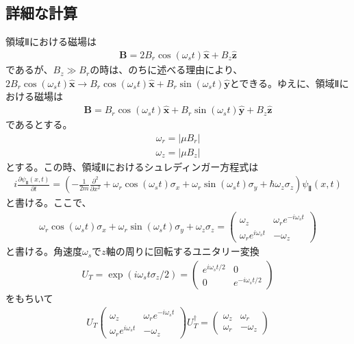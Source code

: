 \subsection{詳細な計算}
領域Ⅱにおける磁場は
\begin{align}
\bm{B}=2B_{r}\cos(\omega_{s}t)\bm{\hat{x}}+B_{z}\bm{\hat{z}}
\end{align}
であるが、$B_{z} \gg B_{r}$の時は、のちに述べる理由により、$2B_{r}\cos(\omega_{s}t)\bm{\hat{x}} \to  B_{r}\cos(\omega_{s}t)\bm{\hat{x}}+B_{r}\sin(\omega_{s}t)\bm{\hat{y}}$とできる。ゆえに、領域Ⅱにおける磁場は
\begin{align}
\bm{B}=B_{r}\cos(\omega_{s}t)\bm{\hat{x}}+B_{r}\sin(\omega_{s}t)\bm{\hat{y}}+B_{z}\bm{\hat{z}}
\end{align}
であるとする。
\begin{align}
\omega_{r}=|{\mu}B_{r}|
\end{align}
\begin{align}
\omega_{z}=|{\mu}B_{z}|
\end{align}
とする。この時、領域Ⅱにおけるシュレディンガー方程式は
\begin{align}
i\frac{\partial {\psi}_{Ⅱ}(x,t)}{\partial t}=\left(-\frac{1}{2m}\frac{\partial^2}{\partial x^2}+\omega_{r}\cos(\omega_{s}t){\sigma}_{x}+\omega_{r}\sin(\omega_{s}t){\sigma}_{y}+{\hbar}\omega_{z}{\sigma}_{z}\right){\psi}_{Ⅱ}(x,t)
\end{align}
と書ける。ここで、
\begin{align}
\omega_{r}\cos(\omega_{s}t){\sigma}_{x}+\omega_{r}\sin(\omega_{s}t){\sigma}_{y}+\omega_{z}{\sigma}_{z}=
\begin{pmatrix}
\omega_{z} &\omega_{r}e^{-i\omega_{s}t} \\
\omega_{r}e^{i\omega_{s}t} &-\omega_{z}
\end{pmatrix}
\end{align}
$と書ける。角速度\omega_{s}でz軸の周りに回転するユニタリー変換$
\begin{align}
U_{T}=\exp(i\omega_{s}t{\sigma}_{z}/2)=
\begin{pmatrix}
e^{i\omega_{s}t/2} &0 \\
0 &e^{-i\omega_{s}t/2}
\end{pmatrix}
\end{align}
をもちいて
\begin{align}
U_{T}\begin{pmatrix}
\omega_{z} &\omega_{r}e^{-i\omega_{s}t} \\
\omega_{r}e^{i\omega_{s}t} &-\omega_{z}
\end{pmatrix}U_{T}^{\dagger}=
\begin{pmatrix}
\omega_{z} &\omega_{r} \\
\omega_{r} &-\omega_{z}
\end{pmatrix}
\end{align}
